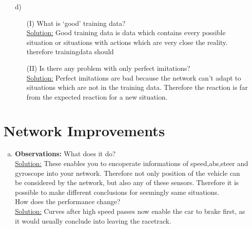 \documentclass[DIN, pagenumber=false, fontsize=11pt, parskip=half]{scrartcl}
\newcommand{\sol}{\underline{Solution:} }
\begin{document}
\begin{enumerate}[b)]
	changing the hyper-parameters? Can you explain this?\\\sol
	Yes, it can be archived. As you change the Hyperparameter, you change the behaviour or the calculation of the network. Therefore it is possible, that you can optimize by changing them.\\
	Low learningrate with few epochs results in a bad learning.
	\item[d)] \begin{enumerate}
		\item[(I)] What is ‘good’ training data? \\\sol
		Good training data is data which contains every possible situation or situations with actions which are very close the reality. therefore trainingdata should 
		\item[(II)] Is there any problem with only perfect imitations?\\\sol
		Perfect imitations are bad because the network can't adapt to situations which are not in the training data. Therefore the reaction is far from the expected reaction for a new situation.
	\end{enumerate}
\end{enumerate}
\section{Network Improvements}
\begin{enumerate}[a)]
	\item \textbf{Observations:} What does it do?\\\sol These enables you to encoperate informations of speed,abs,steer and gyroscope into your network. Therefore not only position of the vehicle can be considered by the network, but also any of these sensors. Therefore it is possible to make different conclusions for seemingly same situations.\\
	
	How does the performance change?
	\\\sol Curves after high speed passes now enable the car to brake first, as it would usually conclude into leaving the racetrack.	
\end{enumerate}
\end{document}
